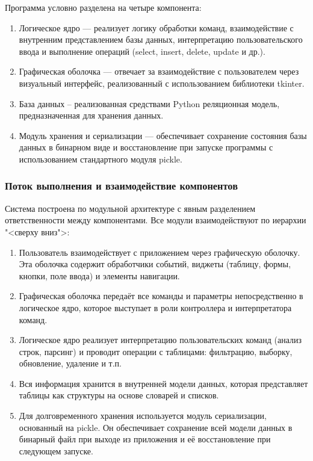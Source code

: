 Программа условно разделена на четыре компонента:
\begin{enumerate}
	\item Логическое ядро — реализует логику обработки команд, взаимодействие с внутренним представлением базы данных, интерпретацию пользовательского ввода и выполнение операций (select, insert, delete, update и др.).
	\item Графическая оболочка — отвечает за взаимодействие с пользователем через визуальный интерфейс, реализованный с использованием библиотеки tkinter.
	\item База данных -- реализованная средствами Python реляционная модель, предназначенная для хранения данных.
	\item Модуль хранения и сериализации — обеспечивает сохранение состояния базы данных в бинарном виде и восстановление при запуске программы с использованием стандартного модуля pickle.
\end{enumerate}

\subsubsection{Поток выполнения и взаимодействие компонентов}

Система построена по модульной архитектуре с явным разделением ответственности между компонентами. Все модули взаимодействуют по иерархии "<сверху вниз">:
\begin{enumerate}
	\item Пользователь взаимодействует с приложением через графическую оболочку. Эта оболочка содержит обработчики событий, виджеты (таблицу, формы, кнопки, поле ввода) и элементы навигации.
	\item Графическая оболочка передаёт все команды и параметры непосредственно в логическое ядро, которое выступает в роли контроллера и интерпретатора команд.
	\item Логическое ядро реализует	интерпретацию пользовательских команд (анализ строк, парсинг) и проводит операции с таблицами: фильтрацию, выборку, обновление, удаление и т.п. 
	\item Вся информация хранится в внутренней модели данных, которая представляет таблицы как структуры на основе словарей и списков.
	\item Для долговременного хранения используется модуль сериализации, основанный на pickle. Он обеспечивает сохранение всей модели данных в бинарный файл при выходе из приложения и её восстановление при следующем запуске.
\end{enumerate}

